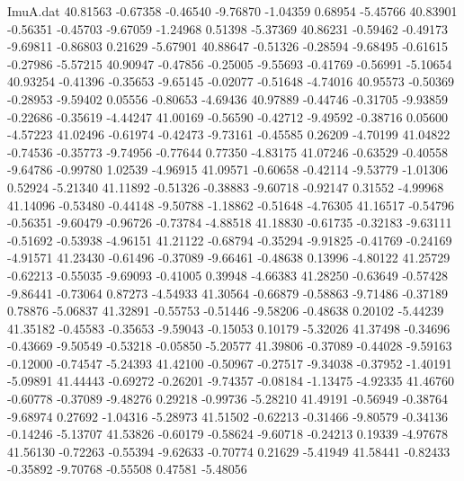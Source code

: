 \begin{filecontents}{ImuA.dat}
  40.81563   -0.67358   -0.46540   -9.76870   -1.04359    0.68954   -5.45766
  40.83901   -0.56351   -0.45703   -9.67059   -1.24968    0.51398   -5.37369
  40.86231   -0.59462   -0.49173   -9.69811   -0.86803    0.21629   -5.67901
  40.88647   -0.51326   -0.28594   -9.68495   -0.61615   -0.27986   -5.57215
  40.90947   -0.47856   -0.25005   -9.55693   -0.41769   -0.56991   -5.10654
  40.93254   -0.41396   -0.35653   -9.65145   -0.02077   -0.51648   -4.74016
  40.95573   -0.50369   -0.28953   -9.59402    0.05556   -0.80653   -4.69436
  40.97889   -0.44746   -0.31705   -9.93859   -0.22686   -0.35619   -4.44247
  41.00169   -0.56590   -0.42712   -9.49592   -0.38716    0.05600   -4.57223
  41.02496   -0.61974   -0.42473   -9.73161   -0.45585    0.26209   -4.70199
  41.04822   -0.74536   -0.35773   -9.74956   -0.77644    0.77350   -4.83175
  41.07246   -0.63529   -0.40558   -9.64786   -0.99780    1.02539   -4.96915
  41.09571   -0.60658   -0.42114   -9.53779   -1.01306    0.52924   -5.21340
  41.11892   -0.51326   -0.38883   -9.60718   -0.92147    0.31552   -4.99968
  41.14096   -0.53480   -0.44148   -9.50788   -1.18862   -0.51648   -4.76305
  41.16517   -0.54796   -0.56351   -9.60479   -0.96726   -0.73784   -4.88518
  41.18830   -0.61735   -0.32183   -9.63111   -0.51692   -0.53938   -4.96151
  41.21122   -0.68794   -0.35294   -9.91825   -0.41769   -0.24169   -4.91571
  41.23430   -0.61496   -0.37089   -9.66461   -0.48638    0.13996   -4.80122
  41.25729   -0.62213   -0.55035   -9.69093   -0.41005    0.39948   -4.66383
  41.28250   -0.63649   -0.57428   -9.86441   -0.73064    0.87273   -4.54933
  41.30564   -0.66879   -0.58863   -9.71486   -0.37189    0.78876   -5.06837
  41.32891   -0.55753   -0.51446   -9.58206   -0.48638    0.20102   -5.44239
  41.35182   -0.45583   -0.35653   -9.59043   -0.15053    0.10179   -5.32026
  41.37498   -0.34696   -0.43669   -9.50549   -0.53218   -0.05850   -5.20577
  41.39806   -0.37089   -0.44028   -9.59163   -0.12000   -0.74547   -5.24393
  41.42100   -0.50967   -0.27517   -9.34038   -0.37952   -1.40191   -5.09891
  41.44443   -0.69272   -0.26201   -9.74357   -0.08184   -1.13475   -4.92335
  41.46760   -0.60778   -0.37089   -9.48276    0.29218   -0.99736   -5.28210
  41.49191   -0.56949   -0.38764   -9.68974    0.27692   -1.04316   -5.28973
  41.51502   -0.62213   -0.31466   -9.80579   -0.34136   -0.14246   -5.13707
  41.53826   -0.60179   -0.58624   -9.60718   -0.24213    0.19339   -4.97678
  41.56130   -0.72263   -0.55394   -9.62633   -0.70774    0.21629   -5.41949
  41.58441   -0.82433   -0.35892   -9.70768   -0.55508    0.47581   -5.48056

\end{filecontents}
